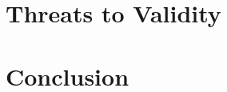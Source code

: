 \section{Threats to Validity}
\label{sec:threats}



\section{Conclusion}

\label{sec:conclusion}










